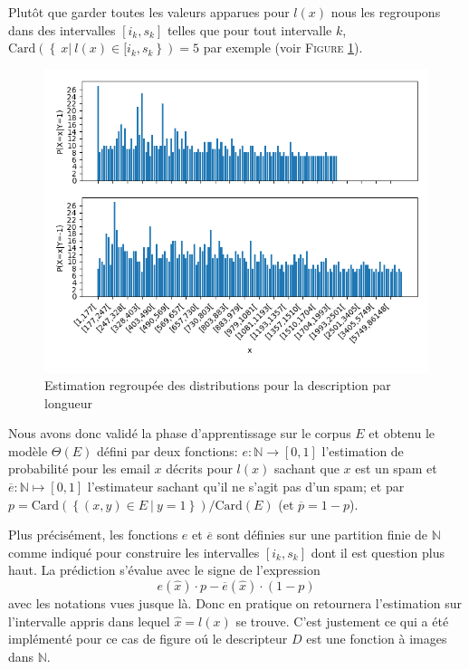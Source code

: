 \documentclass[a4paper, french]{article}
\begin{document}
Plut\^ot que garder toutes les valeurs apparues pour $l(x)$ nous les regroupons 
dans des intervalles $[i_k,s_k]$ telles que pour tout intervalle $k$, 
$\text{Card}\left(\left\{\ x|\ l(x)\in [i_k,s_k\right\}\right)=5$ par exemple
(voir F\textsc{igure} \ref{fig:histo5corpus}).

\begin{figure}[h!]
\begin{center}
    \caption{Estimation regroup\'ee des distributions pour la description par longueur}
    \label{fig:histo5corpus}
    \includegraphics[width=13cm]{histo5}
\end{center}
\end{figure}

\pagebreak
Nous avons donc valid\'e la phase d'apprentissage sur le corpus $E$ et obtenu
le mod\`ele $\Theta(E)$ d\'efini par deux fonctions: 
$e\colon\mathbb{N}\rightarrow [0,1]$ l'estimation de probabilit\'e 
pour les email $x$ d\'ecrits pour $l(x)$ sachant que $x$ est un spam
et $\overline{e}\colon\mathbb{N}\mapsto [0,1]$ l'estimateur sachant qu'il ne s'agit
pas d'un spam; et par $p=\text{Card}\left(\left\{(x,y)\in E\ |\ y=1\right\}\right)/%
\text{Card}(E)$ (et $\overline{p}=1-p$).

Plus pr\'ecis\'ement, les fonctions $e$ et $\overline{e}$ sont d\'efinies 
sur une partition finie de $\mathbb{N}$ comme indiqu\'e
pour construire les intervalles $[i_k,s_k]$ dont il est question plus haut.
La pr\'ediction s'\'evalue avec le signe de l'expression
\begin{equation}
    e(\hat{x}) \cdot p - \overline{e}(\hat{x}) \cdot (1-p)
\end{equation}
avec les notations vues jusque l\`a. Donc en pratique on retournera l'estimation 
sur l'intervalle appris dans lequel $\hat{x}=l(x)$ se trouve. C'est justement ce
qui a \'et\'e impl\'ement\'e pour ce cas de figure o\'u le descripteur $D$ est une
fonction \`a images dans $\mathbb{N}$.
\end{document}
